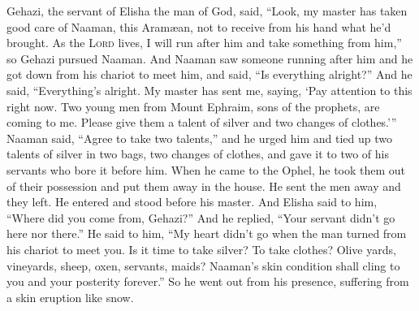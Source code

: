 \begin{inparaenum}
   Gehazi, the servant of Elisha the man of God, said, ``Look, my master has taken good care of Naaman, this Aram\ae{}an, not to receive from his hand what he'd brought. As the \textsc{Lord} lives, I will run after him and take something from him,''%
   so Gehazi pursued Naaman. And Naaman saw someone running after him and he got down from his chariot to meet him, and said, ``Is everything alright?''%
   And he said, ``Everything's alright. My master has sent me, saying, `Pay attention to this right now. Two young men from Mount Ephraim, sons of the prophets, are coming to me. Please give them a talent of silver and two changes of clothes.'\thinspace''%
   Naaman said, ``Agree to take two talents,'' and he urged him and tied up two talents of silver in two bags, two changes of clothes, and gave it to two of his servants who bore it before him.%
   When he came to the Ophel, he took them out of their possession and put them away in the house. He sent the men away and they left.%
   He entered and stood before his master. And Elisha said to him, ``Where did you come from, Gehazi?'' And he replied, ``Your servant didn't go here nor there.''%
   He said to him, ``My heart didn't go when the man turned from his chariot to meet you.  Is it time to take silver? To take clothes? Olive yards, vineyards, sheep, oxen, servants, maids?%
   Naaman's skin condition shall cling to you and your posterity forever.'' So he went out from his presence, suffering from a skin eruption like snow.%
\end{inparaenum}
